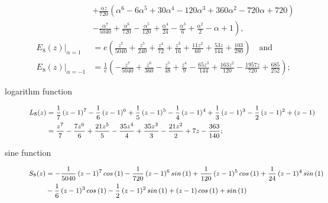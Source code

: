 \begin{description}
\begin{displaymath}
\begin{split}
                                &+ \frac{\alpha z}{720} \left(\alpha^{6} - 6 \alpha^{5} + 30 \alpha^{4} - 120 \alpha^{3} + 360 \alpha^{2} - 720 \alpha + 720\right) \\
                                &- \left.\frac{\alpha^{7}}{5040} + \frac{\alpha^{6}}{720} - \frac{\alpha^{5}}{120} + \frac{\alpha^{4}}{24} - \frac{\alpha^{3}}{6} + \frac{\alpha^{2}}{2} -\alpha + 1\right), \\
        \left.E_{8}{\left (z \right )}\right|_{\alpha=1} &= e \left(\frac{z^{7}}{5040} + \frac{z^{5}}{240} + \frac{z^{4}}{72} + \frac{z^{3}}{16} + \frac{11 z^{2}}{60} + \frac{53 z}{144} + \frac{103}{280}\right)\quad\text{and}\\
        \left.E_{8}{\left (z \right )}\right|_{\alpha=-1} &=\frac{1}{e} \left( - \frac{z^{7}}{5040} + \frac{z^{6}}{360} - \frac{z^{5}}{48} + \frac{z^{4}}{9}\right. - \left.\frac{65 z^{3}}{144} + \frac{163 z^{2}}{120} - \frac{1957 z}{720} + \frac{685}{252}\right);
    \end{split}
\end{displaymath}
\item[logarithm function]
\begin{displaymath}
\footnotesize
    \begin{split}
        L_{8}{\left (z \right )}    &= \frac{1}{7} \left(z - 1\right)^{7} - \frac{1}{6} \left(z - 1\right)^{6} + \frac{1}{5} \left(z - 1\right)^{5} - \frac{1}{4} \left(z - 1\right)^{4} + \frac{1}{3} \left(z - 1\right)^{3} - \frac{1}{2} \left(z - 1\right)^{2} + (z - 1)\\
                                &= \frac{z^{7}}{7} - \frac{7 z^{6}}{6} + \frac{21 z^{5}}{5} - \frac{35 z^{4}}{4} + \frac{35 z^{3}}{3} - \frac{21 z^{2}}{2} + 7 z - \frac{363}{140};
    \end{split}
\end{displaymath}
\item[sine function]
\begin{displaymath}
    \footnotesize
    \begin{split}
        S_{8}{\left (z \right )} &= - \frac{1}{5040} \left(z - 1\right)^{7} cos\,{\left (1 \right )} - \frac{1}{720} \left(z - 1\right)^{6} sin\,{\left (1 \right )} + \frac{1}{120} \left(z - 1\right)^{5} cos\,{\left (1 \right )} + \frac{1}{24} \left(z - 1\right)^{4} sin\,{\left (1 \right )} \\
                             &- \frac{1}{6} \left(z - 1\right)^{3} cos\,{\left (1 \right )} - \frac{1}{2} \left(z - 1\right)^{2} sin\,{\left (1 \right )} + \left(z - 1\right) cos\,{\left (1 \right )} + sin\,{\left (1 \right )}\\

\end{split}
\end{displaymath}
\end{description}
